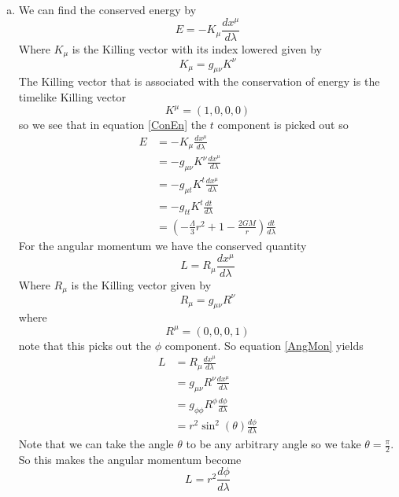 \documentclass[11pt]{article}
\numberwithin{equation}{section}
\begin{document}
\begin{enumerate}[(a)]
\item
We can find the conserved energy by 
\begin{equation}
E = -K_{\mu}\frac{dx^{\mu}}{d\lambda}
\label{ConEn}
\end{equation}
Where $K_{\mu}$ is the Killing vector with its index lowered given by
$$K_{\mu} = g_{\mu\nu}K^{\nu}$$
 The Killing vector that is associated with the conservation of energy is the timelike Killing vector 
$$K^{\mu} = (1,0,0,0)$$
so we see that in equation \ref{ConEn} the $t$ component is picked out so
\begin{align*}
E &= -K_{\mu}\frac{dx^{\mu}}{d\lambda}\\
&= -g_{\mu\nu}K^{\nu}\frac{dx^{\mu}}{d\lambda}\\
&= -g_{\mu t}K^{t}\frac{dx^{\mu}}{d\lambda}\\
&= -g_{tt}K^{t}\frac{dt}{d\lambda}\\
&= \left(-\frac{\Lambda}{3}r^2 + 1 - \frac{2GM}{r}\right)\frac{dt}{d\lambda}
\end{align*}
For the angular momentum we have the conserved quantity
\begin{equation}
L = R_{\mu}\frac{dx^{\mu}}{d\lambda}
\label{AngMon}
\end{equation}
Where $R_{\mu}$ is the Killing vector given by
$$R_{\mu} = g_{\mu\nu}R^{\nu}$$
where
$$R^{\mu} = (0,0,0,1)$$
note that this picks out the $\phi$ component. So equation \ref{AngMon} yields
\begin{align*}
L &= R_{\mu}\frac{dx^{\mu}}{d\lambda}\\
&= g_{\mu\nu}R^{\nu}\frac{dx^{\mu}}{d\lambda}\\
&= g_{\phi\phi}R^{\phi}\frac{d\phi}{d\lambda}\\
&= r^2\sin^2(\theta)\frac{d\phi}{d\lambda}
\end{align*}
Note that we can take the angle $\theta$ to be any arbitrary angle so we take $\theta = \frac{\pi}{2}$. So this makes the angular momentum become
$$L = r^2\frac{d\phi}{d\lambda}$$


\end{enumerate}
\end{document}
